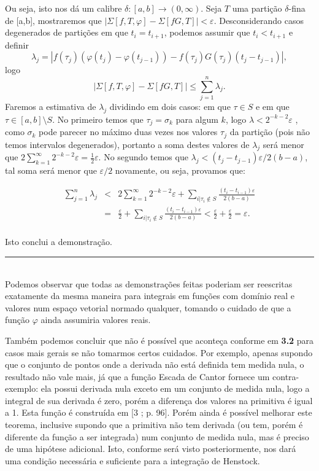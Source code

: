 \documentclass[12pt, a4paper]{article}
\def\eop{\hfill\rule{2.5mm}{2.5mm}}
\theoremstyle{definition}
\begin{document}
Ou seja, isto nos dá um calibre $\delta:[a,b]\rightarrow (0,\infty)$. Seja $T$ uma partição $\delta$-fina de [a,b], mostraremos que $\left| \Sigma [f,T,\varphi] - \Sigma [fG,T] \right|<\varepsilon$. Desconsiderando casos degenerados de partições em que $t_i=t_{i+1}$, podemos assumir que $t_i<t_{i+1}$ e definir $$\lambda_j=|f(\tau_j)(\varphi(t_j)-\varphi(t_{j-1})) - f(\tau_j)G(\tau_j)(t_j-t_{j-1})|,$$ logo $$\left| \Sigma [f,T,\varphi] - \Sigma [fG,T] \right| \leq \sum_{j=1}^n \lambda_j.$$ Faremos a estimativa de $\lambda_j$ dividindo em dois casos: em que $\tau\in S$ e em que $\tau\in [a,b]\setminus S$. No primeiro temos que $\tau_j=\sigma_k$ para algum $k$, logo $\lambda < 2^{-k-2}\varepsilon$ , como $\sigma_k$ pode parecer no máximo duas vezes nos valores $\tau_j$ da partição (pois não temos intervalos degenerados), portanto a soma destes valores de $\lambda_j$ será menor que $2\sum_{k=1}^{\infty}  2^{-k-2}\varepsilon=\frac{1}{2} \varepsilon$. No segundo temos que $\lambda_j< (t_j-t_{j-1})\varepsilon / 2(b-a)$, tal soma será menor que $\varepsilon / 2$ novamente, ou seja, provamos que: 

$$ \begin{array}{lll}

\displaystyle \sum_{j=1}^n \lambda_j  & < & 2\displaystyle\sum_{k=1}^{\infty}  2^{-k-2}\varepsilon + \displaystyle\sum_{i|\tau_i\notin S}\displaystyle\frac{(t_i-t_{i-1})\varepsilon}{2(b-a)} \\

\ & = & \displaystyle\frac{\varepsilon}{2}+ \displaystyle\sum_{i|\tau_i\notin S}\displaystyle\frac{(t_i-t_{i-1})\varepsilon}{2(b-a)}<\displaystyle\frac{\varepsilon}{2}+\frac{\varepsilon}{2} = \varepsilon. \\
 
\end{array} $$ 

Isto conclui a demonstração. \eop \\

Podemos observar que todas as demonstrações feitas poderiam ser reescritas exatamente da mesma maneira para integrais em funções com domínio real e valores num espaço vetorial normado qualquer, tomando o cuidado de que a função $\varphi$ ainda assumiria valores reais. 

Também podemos concluir que não é possível que aconteça conforme em \textbf{3.2} para casos mais gerais se não tomarmos certos cuidados. Por exemplo, apenas supondo que o conjunto de pontos onde a derivada não está definida tem medida nula, o resultado não vale mais, já que a função Escada de Cantor fornece um contra-exemplo: ela possui derivada nula exceto em um conjunto de medida nula, logo a integral de sua derivada é zero, porém a diferença dos valores na primitiva é igual a 1. Esta função é construída em [3 ; p. 96]. Porém ainda é possível melhorar este teorema, inclusive supondo que a primitiva não tem derivada (ou tem, porém é diferente da função a ser integrada) num conjunto de medida nula, mas é preciso de uma hipótese adicional. Isto, conforme será visto posteriormente, nos dará uma condição necessária e suficiente para a integração de Henstock.
\end{document}
